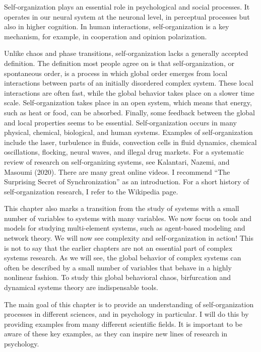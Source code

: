 \documentclass[
  a4paper,
  DIV=11,
  numbers=noendperiod,
  oneside]{scrreprt}
\begin{document}
Self-organization plays an essential role in psychological and social
processes. It operates in our neural system at the neuronal level, in
perceptual processes but also in higher cognition. In human
interactions, self-organization is a key mechanism, for example, in
cooperation and opinion polarization.

Unlike chaos and phase transitions, self-organization lacks a generally
accepted definition. The definition most people agree on is that
self-organization, or spontaneous order, is a process in which global
order emerges from local interactions between parts of an initially
disordered complex system. These local interactions are often fast,
while the global behavior takes place on a slower time scale.
Self-organization takes place in an open system, which means that
energy, such as heat or food, can be absorbed. Finally, some feedback
between the global and local properties seems to be essential.
Self-organization occurs in many physical, chemical, biological, and
human systems. Examples of self-organization include the laser,
turbulence in fluids, convection cells in fluid dynamics, chemical
oscillations, flocking, neural waves, and illegal drug markets. For a
systematic review of research on self-organizing systems, see Kalantari,
Nazemi, and Masoumi (2020). There are many great online videos. I
recommend ``The Surprising Secret of Synchronization'' as an
introduction. For a short history of self-organization research, I refer
to the Wikipedia page.

This chapter also marks a transition from the study of systems with a
small number of variables to systems with many variables. We now focus
on tools and models for studying multi-element systems, such as
agent-based modeling and network theory. We will now see complexity and
self-organization in action! This is not to say that the earlier
chapters are not an essential part of complex systems research. As we
will see, the global behavior of complex systems can often be described
by a small number of variables that behave in a highly nonlinear
fashion. To study this global behavioral chaos, birfurcation and
dynamical systems theory are indispensable tools.

The main goal of this chapter is to provide an understanding of
self-organization processes in different sciences, and in psychology in
particular. I will do this by providing examples from many different
scientific fields. It is important to be aware of these key examples, as
they can inspire new lines of research in psychology.
\end{document}
